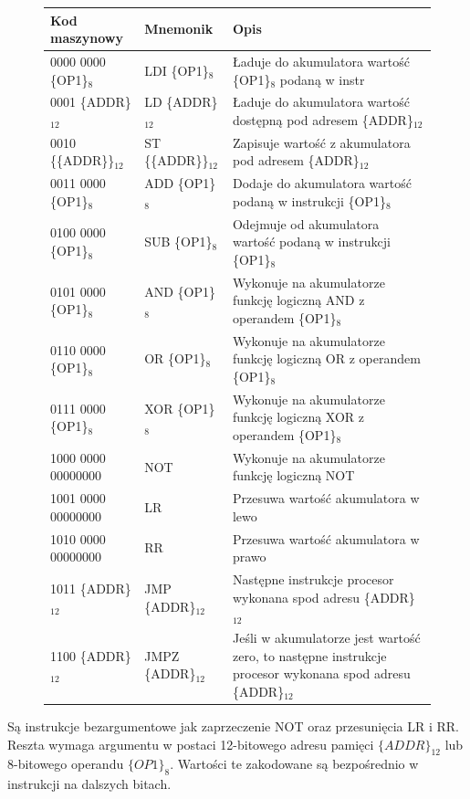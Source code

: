 \documentclass[a4paper,12pt]{article}
\begin{document}
\begin{figure}[htb]
  \centering
\begin{tabular}{ | l | l | p{10cm} | }
  \hline
  Kod maszynowy  & Mnemonik & Opis \\ \hline
  0000 0000 \{OP1\}$_8$  & LDI \{OP1\}$_8$     & Ładuje do akumulatora wartość \{OP1\}$_8$ podaną w instr \\ \hline
  0001 \{ADDR\}$_{12}$   & LD \{ADDR\}$_{12}$ & Ładuje do akumulatora wartość dostępną pod adresem \{ADDR\}$_{12}$ \\ \hline
  0010 \{\{ADDR\}\}$_{12}$   & ST \{\{ADDR\}\}$_{12}$ & Zapisuje wartość z akumulatora pod adresem \{ADDR\}$_{12}$ \\ \hline
  0011 0000 \{OP1\}$_8$  & ADD \{OP1\}$_8$  & Dodaje do akumulatora wartość podaną w instrukcji \{OP1\}$_8$ \\ \hline
  0100 0000 \{OP1\}$_8$  & SUB \{OP1\}$_8$  & Odejmuje od akumulatora wartość podaną w instrukcji \{OP1\}$_8$ \\ \hline
  0101 0000 \{OP1\}$_8$  & AND \{OP1\}$_8$  & Wykonuje na akumulatorze funkcję logiczną AND z operandem \{OP1\}$_8$ \\ \hline
  0110 0000 \{OP1\}$_8$  & OR  \{OP1\}$_8$  & Wykonuje na akumulatorze funkcję logiczną OR  z operandem \{OP1\}$_8$ \\ \hline
  0111 0000 \{OP1\}$_8$  & XOR \{OP1\}$_8$  & Wykonuje na akumulatorze funkcję logiczną XOR z operandem \{OP1\}$_8$ \\ \hline
  1000 0000 00000000 & NOT          & Wykonuje na akumulatorze funkcję logiczną NOT \\ \hline
  1001 0000 00000000 & LR           & Przesuwa wartość akumulatora w lewo \\ \hline
  1010 0000 00000000 & RR           & Przesuwa wartość akumulatora w prawo \\ \hline
  1011 \{ADDR\}$_{12}$ & JMP  \{ADDR\}$_{12}$ & Następne instrukcje procesor wykonana spod adresu \{ADDR\}$_{12}$ \\ \hline
  1100 \{ADDR\}$_{12}$ & JMPZ \{ADDR\}$_{12}$ & Jeśli w akumulatorze jest wartość zero, to następne instrukcje procesor wykonana spod adresu \{ADDR\}$_{12}$ \\ \hline
\end{tabular}
\end{figure}

Są instrukcje bezargumentowe jak zaprzeczenie NOT oraz przesunięcia LR i RR. Reszta wymaga argumentu w postaci 12-bitowego adresu pamięci $\{ADDR\}_{12}$ lub 8-bitowego operandu $\{OP1\}_8$. Wartości te zakodowane są bezpośrednio w instrukcji na dalszych bitach.
\end{document}
